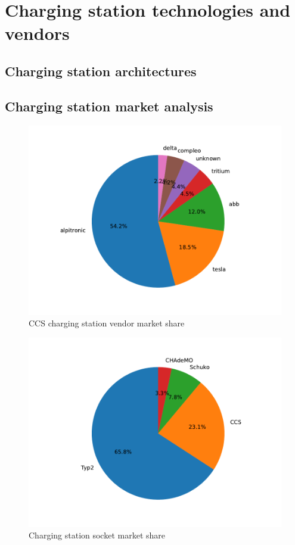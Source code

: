\documentclass[conference,flushend]{iaria} %
\begin{document}
\section{Charging station technologies and vendors}

\subsection{Charging station architectures}

\subsection{Charging station market analysis}



\begin{figure}[ht]
    \centering
    \includegraphics[width=.489\textwidth]{graphs/market_analysis.pdf}
    \caption{CCS charging station vendor market share}
    \label{fig:marketshare}
\end{figure}

\begin{figure}[ht]
    \centering
    \includegraphics[width=.489\textwidth]{graphs/socket_analysis.pdf}
    \caption{Charging station socket market share}
    \label{fig:sockets}
\end{figure}
\end{document}
